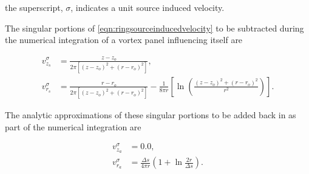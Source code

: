 \where the superscript, \(\sigma\), indicates a unit source induced velocity.


The singular portions of \cref{eqn:ringsourceinducedvelocity} to be subtracted during the numerical integration of a vortex panel influencing itself are

\begin{subequations}
    \label{eqn:ringsourcesingular}
    \begin{align}
        v_{z_s}^\sigma &= \frac{z-z_o}{2\pi\left[\left(z-z_o\right)^2 + \left(r-r_o\right)^2\right] }, \\
        v_{r_s}^\sigma &= \frac{r-r_o}{2\pi\left[\left(z-z_o\right)^2 + \left(r-r_o\right)^2\right] }
    -\frac{1}{8\pi r} \left[\ln\left(\frac{\left(z-z_o\right)^2 + \left(r-r_o\right)^2}{r^2}\right)\right].
    \end{align}
\end{subequations}

\noindent The analytic approximations of these singular portions to be added back in as part of the numerical integration are

\begin{subequations}
    \label{eqn:ringsourceanalytic}
    \begin{align}
        v_{z_a}^\sigma &= 0.0, \\
        v_{r_a}^\sigma &=\frac{\Delta s}{4\pi r} \left( 1 + \ln\frac{2 r}{\Delta s}\right).
    \end{align}
\end{subequations}





